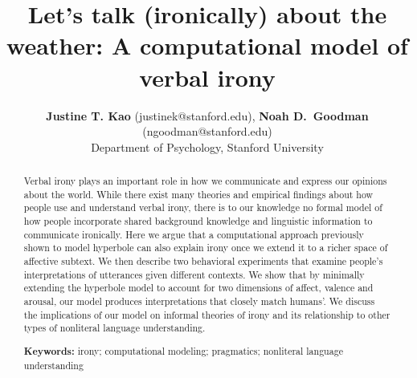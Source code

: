 \documentclass[10pt,letterpaper]{article}
\title{Let's talk (ironically) about the weather: A computational model of verbal irony}
\author{{\large {\bf Justine T. Kao} (justinek@stanford.edu)}, {\large {\bf Noah D.~Goodman} (ngoodman@stanford.edu)}\\
  Department of Psychology, Stanford University}
\begin{document}
\maketitle


\begin{abstract}
Verbal irony plays an important role in how we communicate and express our opinions about the world. While there exist many theories and empirical findings about how people use and understand verbal irony, there is to our knowledge no formal model of how people incorporate shared background knowledge and linguistic information to communicate ironically. Here we argue that a computational approach previously shown to model hyperbole \cite{kao2014nonliteral} can also explain irony once we extend it to a richer space of affective subtext. We then describe two behavioral experiments that examine people's interpretations of utterances given different contexts. We show that by minimally extending the hyperbole model to account for two dimensions of affect, valence and arousal, our model produces interpretations that closely match humans'. We discuss the implications of our model on informal theories of irony and its relationship to other types of nonliteral language understanding.


\textbf{Keywords:} 
irony; computational modeling; pragmatics; nonliteral language understanding
\end{abstract}
\end{document}
